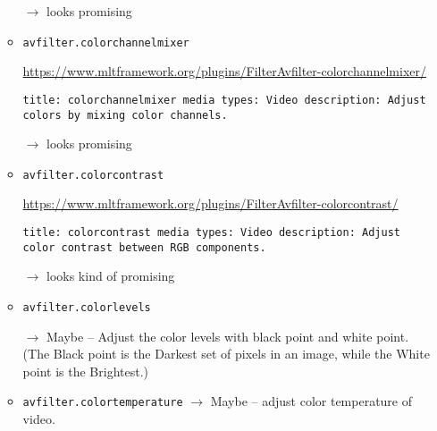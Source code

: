 \documentclass[12pt,a4paper]{article}
\begin{document}
\begin{itemize}
\begin{itemize}
		$\rightarrow$ looks promising
		
		\item \texttt{avfilter.colorchannelmixer}
		
		\url{https://www.mltframework.org/plugins/FilterAvfilter-colorchannelmixer/}
		
		\texttt{title: colorchannelmixer \newline
			media types: Video \newline
			description: Adjust colors by mixing color channels.}
		
		$\rightarrow$ looks promising
		
		
		\item \texttt{avfilter.colorcontrast}
		
		\url{https://www.mltframework.org/plugins/FilterAvfilter-colorcontrast/}
		
		\texttt{title: colorcontrast \newline
			media types: Video \newline
			description: Adjust color contrast between RGB components.}
		
		$\rightarrow$ looks kind of promising
		
		
		
		
		
		
		\item \texttt{avfilter.colorlevels}
		
		$\rightarrow$ Maybe -- Adjust the color levels with black point and white point.
		(The Black point is the Darkest set of pixels in an image, while the White point is the Brightest.)
		
		
		
		
		\item \texttt{avfilter.colortemperature}
		$\rightarrow$ Maybe -- adjust color temperature of video.
		

\end{itemize}
\end{itemize}
\end{document}
